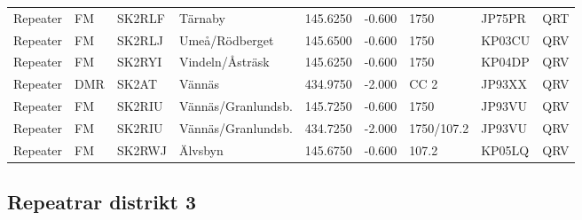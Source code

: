 \begin{landscape}
\begin{longtable}{llllrrlll}
Repeater   & FM          & SK2RLF    & Tärnaby            & 145.6250     & -0.600     & 1750       & JP75PR      & QRT      \\
Repeater   & FM          & SK2RLJ    & Umeå/Rödberget     & 145.6500     & -0.600     & 1750       & KP03CU      & QRV      \\
Repeater   & FM          & SK2RYI    & Vindeln/Åsträsk    & 145.6250     & -0.600     & 1750       & KP04DP      & QRV      \\
Repeater   & DMR         & SK2AT     & Vännäs             & 434.9750     & -2.000     & CC 2       & JP93XX      & QRV      \\
Repeater   & FM          & SK2RIU    & Vännäs/Granlundsb. & 145.7250     & -0.600     & 1750       & JP93VU      & QRV      \\
Repeater   & FM          & SK2RIU    & Vännäs/Granlundsb. & 434.7250     & -2.000     & 1750/107.2 & JP93VU      & QRV      \\
Repeater   & FM          & SK2RWJ    & Älvsbyn            & 145.6750     & -0.600     & 107.2      & KP05LQ      & QRV      \\
\end{longtable}



\clearpage

\subsection{Repeatrar distrikt 3}




\end{landscape}
